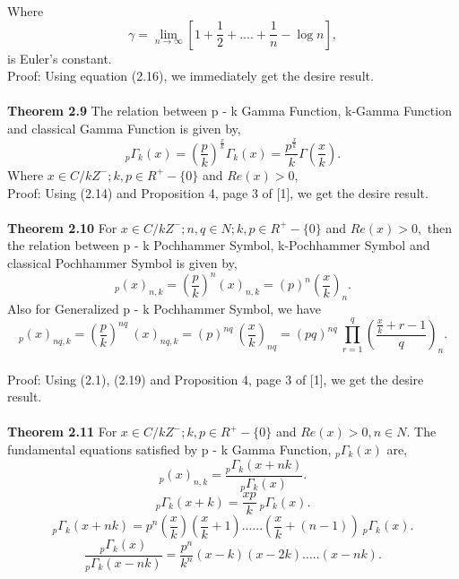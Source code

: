 \documentclass[11pt,a4paper]{article}
\numberwithin{equation}{section}
\begin{document}
Where\[ \gamma = \lim_{n \rightarrow \infty}[1+\frac{1}{2}+....+\frac{1}{n}-\log n],\] is Euler's constant.\\
Proof: Using equation (2.16), we immediately get the desire result.\\\\
\textbf{Theorem 2.9} The relation between p - k Gamma Function, k-Gamma Function and classical Gamma Function is given by,
\begin{equation}
 _{p}\Gamma_{k}(x)=(\frac{p}{k})^{\frac{x}{k}}\Gamma_{k}(x)= \frac{p^{\frac{x}{k}}}{k}\Gamma(\frac{x}{k}).
\end{equation}
Where $ x\in C / kZ^{-}; k,p\in R^{+}-\lbrace 0 \rbrace $ and $ Re(x)>0, $\\
Proof: Using (2.14) and Proposition 4, page 3 of [1], we get the desire result.\\\\
\textbf{Theorem 2.10} For $ x\in C / kZ^{-}; n,q \in N ;k,p\in R^{+}-\lbrace 0 \rbrace $ and $ Re(x)>0, $ then the relation between p - k Pochhammer Symbol, k-Pochhammer Symbol and classical Pochhammer Symbol is given by,
\begin{equation}
_{p}(x)_{n,k}=(\frac{p}{k})^n(x)_{n,k} = (p)^n(\frac{x}{k})_{n}.
\end{equation}
Also for Generalized p - k Pochhammer Symbol, we have  
\begin{equation}
_{p}(x)_{nq ,k}=(\frac{p}{k})^{nq} \:(x)_{nq,k} = (p)^{nq} \:(\frac{x}{k})_{nq}=(pq)^{nq}\:\prod_{r=1}^{q}(\dfrac{\frac{x}{k}+r-1}{q})_{n}.
\end{equation}
 \\
Proof: Using (2.1), (2.19) and Proposition 4, page 3 of [1], we get the desire result.\\\\
\textbf{Theorem 2.11} For $ x\in C/kZ^{-} ;  k,p \in R^{+}-\lbrace 0 \rbrace $ and $ Re(x)>0, n\in N. $ The fundamental equations satisfied by p - k Gamma Function, $ _{p}\Gamma_{k}(x) $ are,
\begin{equation}
_{p}(x)_{n,k}=\frac{ _{p}\Gamma_{k}(x+nk)}{ _{p}\Gamma_{k}(x)}.
\end{equation}
\begin{equation}
 _{p}\Gamma_{k}(x+k)=\frac{xp}{k}\: _{p}\Gamma_{k}(x).
\end{equation}
\begin{equation}
 _{p}\Gamma_{k}(x+nk)= p^{n}(\frac{x}{k})(\frac{x}{k}+1)......(\frac{x}{k}+(n-1))\:_{p}\Gamma_{k}(x).
\end{equation}
\begin{equation}
\frac{_{p}\Gamma_{k}(x)}{_{p}\Gamma_{k}(x-nk)}=\frac{p^{n}}{k^{n}}(x-k)(x-2k).....(x-nk).
\end{equation}
\end{document}

